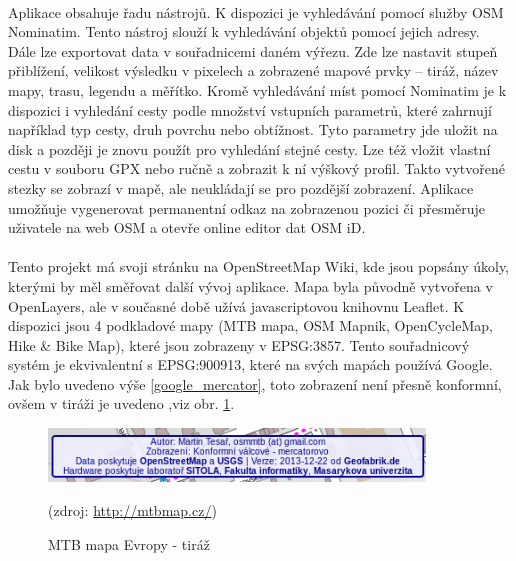 \documentclass[11pt,a4paper,titlepage,oneside]{book}
\begin{document}
		\paragraph{} Aplikace obsahuje řadu nástrojů. K dispozici je vyhledávání pomocí služby \ac{OSM} Nominatim\cite{nominatim}. Tento nástroj slouží k vyhledávání objektů pomocí jejich adresy. Dále lze exportovat data v souřadnicemi daném výřezu. Zde lze nastavit stupeň přiblížení, velikost výsledku v pixelech a zobrazené mapové prvky -- tiráž, název mapy, trasu, legendu a měřítko. Kromě vyhledávání míst  pomocí Nominatim je k dispozici i vyhledání cesty podle množství vstupních parametrů, které zahrnují například typ cesty, druh povrchu nebo obtížnost. Tyto parametry jde uložit na disk a později je znovu použít pro vyhledání stejné cesty. Lze též vložit vlastní cestu v souboru \ac{GPX} nebo ručně a zobrazit k ní výškový profil. Takto vytvořené stezky se zobrazí v mapě, ale neukládají se pro pozdější zobrazení. Aplikace umožňuje vygenerovat permanentní odkaz na zobrazenou pozici či přesměruje uživatele na web \acl{OSM} a otevře online editor dat \ac{OSM} iD.


		\paragraph{} Tento projekt má svoji stránku na OpenStreetMap Wiki, kde jsou popsány úkoly, kterými by měl směřovat další vývoj aplikace. Mapa byla původně vytvořena v OpenLayers\cite{tesar_bp}, ale v současné době užívá javascriptovou knihovnu Leaflet. K dispozici jsou 4 podkladové mapy (MTB mapa, OSM Mapnik, OpenCycleMap, Hike \& Bike Map), které jsou zobrazeny v EPSG:3857. Tento souřadnicový systém je ekvivalentní s EPSG:900913, které na svých mapách používá Google. Jak bylo uvedeno výše \ref{google_mercator}, toto zobrazení není přesně konformní, ovšem v tiráži je uvedeno ,viz obr. \ref{fig:MTB_tiraz}.
		\begin{figure}[!h]
			\begin{center}
				\includegraphics[width=10cm]{obrazky/tiraz.png}
				\caption{MTB mapa Evropy - tiráž}
				(zdroj: \url{http://mtbmap.cz/})
				\label{fig:MTB_tiraz}
			\end{center}
		\end{figure}
\end{document}
